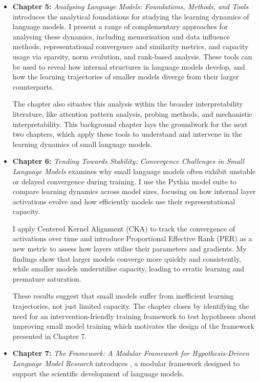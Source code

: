 \begin{itemize}
    \item \textbf{Chapter 5:} \emph{Analysing Language Models: Foundations, Methods, and Tools} introduces the analytical foundations for studying the learning dynamics of language models. I present a range of complementary approaches for analysing these dynamics, including memorisation and data influence methods, representational convergence and similarity metrics, and capacity usage via sparsity, norm evolution, and rank-based analysis. These tools can be used to reveal how internal structures in language models develop, and how the learning trajectories of smaller models diverge from their larger counterparts.

    The chapter also situates this analysis within the broader interpretability literature, like attention pattern analysis, probing methods, and mechanistic interpretability. This background chapter lays the groundwork for the next two chapters, which apply these tools to understand and intervene in the learning dynamics of small language models.

    \item \textbf{Chapter 6:} \emph{Tending Towards Stability: Convergence Challenges in Small Language Models} examines why small language models often exhibit unstable or delayed convergence during training. I use the Pythia model suite to compare learning dynamics across model sizes, focusing on how internal layer activations evolve and how efficiently models use their representational capacity.

    I apply Centered Kernel Alignment (CKA) to track the convergence of activations over time and introduce Proportional Effective Rank (PER) as a new metric to assess how layers utilise their parameters and gradients. My findings show that larger models converge more quickly and consistently, while smaller models underutilise capacity, leading to erratic learning and premature saturation.
    
    These results suggest that small models suffer from inefficient learning trajectories, not just limited capacity. The chapter closes by identifying the need for an intervention-friendly training framework to test hypotheses about improving small model training which motivates the design of the \pico framework presented in Chapter 7.

    \item \textbf{Chapter 7:} \emph{The \pico Framework: A Modular Framework for Hypothesis-Driven Language Model Research} introduces \pico, a modular framework designed to support the scientific development of language models.


\end{itemize}
